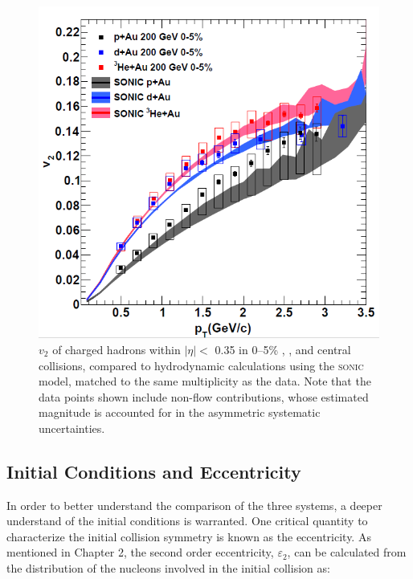 
\begin{figure}[!ht]
\begin{center}
\includegraphics[width=0.65\linewidth]{figs/three_system_comparison_result.png}
\caption{$v_2$ of charged hadrons within $|\eta| <$ 0.35 in 0--5\% \pau, \dau, and \hau central collisions, compared to hydrodynamic calculations using the \textsc{sonic} model, matched to the same multiplicity as the data. Note that the data points shown include non-flow contributions, whose estimated magnitude is accounted for in the asymmetric systematic uncertainties.}
\label{fig:all_system_hydro}
\end{center}
\end{figure}

\subsection{Initial Conditions and Eccentricity}
In order to better understand the comparison of the three systems, a deeper understand of the initial conditions is warranted. One critical quantity to characterize the initial collision symmetry is known as the eccentricity. As mentioned in Chapter 2, the second order eccentricity, $\varepsilon_2$, can be calculated from the distribution of the nucleons involved in the initial collision as:

